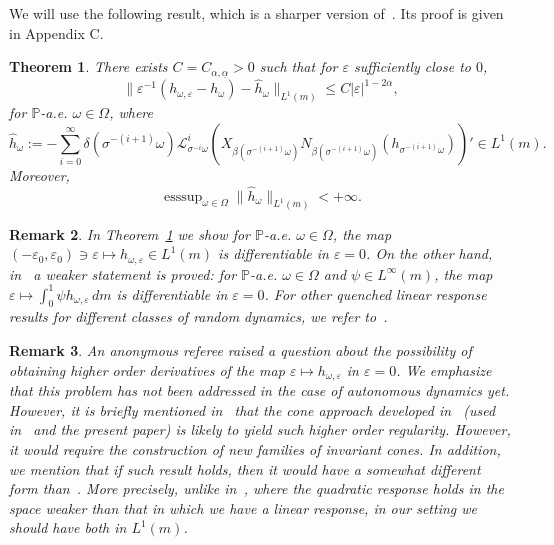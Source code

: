 \documentclass[12pt,reqno,a4paper]{article}
\newtheorem{theorem}{Theorem}
\newtheorem{remark}[theorem]{Remark}
\DeclareMathOperator{\esssup}{esssup}
\begin{document}
	We will use the following result, which is a sharper version of~\cite[Theorem 14]{DGTS}. Its proof is given in Appendix C.
	\begin{theorem}\label{sharpl}
		There exists $C=C_{\alpha, \underline{\alpha}}>0$ such that for $\varepsilon$ sufficiently close to $0$,
		\begin{equation}\label{stronger}
			\|\varepsilon^{-1}(h_{\omega, \varepsilon}-h_\omega)-\hat h_\omega \|_{L^1(m)}\le C|\varepsilon|^{1-2\alpha},
		\end{equation}
		for $\mathbb P$-a.e. $\omega \in \Omega$,
		where
		\begin{equation}\label{series}
			\hat h_\omega:=-\sum_{i=0}^\infty \delta (\sigma^{-(i+1)}\omega) \mathcal L_{\sigma^{-i}\omega}^i \left(X_{\beta(\sigma^{-(i+1)}\omega)} N_{\beta(\sigma^{-(i+1)}\omega)} (h_{\sigma^{-(i+1)}\omega}) \right)' \in L^1(m).
		\end{equation}
		Moreover, 
		\begin{equation}\label{series2}
			\esssup_{\omega \in \Omega}\|\hat h_\omega \|_{L^1(m)}<+\infty.
		\end{equation}
	\end{theorem}
	
	\begin{remark}\label{sharplc}
		In Theorem~\ref{sharpl} we show for $\mathbb P$-a.e. $\omega \in \Omega$, the map $ (-\varepsilon_0, \varepsilon_0)\ni \varepsilon \mapsto h_{\omega, \varepsilon}\in L^1(m)$ is differentiable in $\varepsilon=0$. On the other hand, in~\cite[Theorem 14]{DGTS} a weaker statement is proved: for $\mathbb P$-a.e. $\omega \in \Omega$ and $\psi \in L^\infty(m)$, the map $\varepsilon \mapsto \int_0^1\psi h_{\omega, \varepsilon}\, dm$ is differentiable in $\varepsilon=0$. For other quenched linear response results for different classes of random dynamics, we refer to~\cite{CN,DGS, DH2, DS, SR}.
	\end{remark}

    \begin{remark}
An anonymous referee raised a question about the possibility of obtaining higher order derivatives of the map $\varepsilon \mapsto h_{\omega, \varepsilon}$ in $\varepsilon=0$. We emphasize that this problem has not been addressed in the case of autonomous dynamics yet. However, it is briefly mentioned in~\cite[p.859]{BT} that the cone approach developed in~\cite{BT} (used in~\cite{DGTS} and the present paper) is likely to yield such higher order regularity. However, it would require the construction of new families of invariant cones. In addition, we mention that if such result holds, then it would have a somewhat different form than~\cite[Theorem 3.6]{CN}. More precisely, unlike in~\cite{CN}, where the quadratic response holds in the space weaker than that in which we have a linear response, in our setting we should have both in $L^1(m)$.
\end{remark}
	
\end{document}
